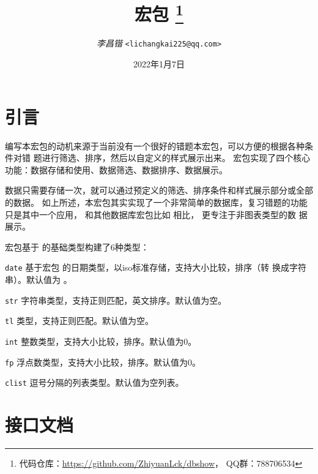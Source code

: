 \documentclass[full]{l3doc}
\begin{document}
\title{
   宏包
  \protect\footnote{%
    代码仓库：\url{https://github.com/ZhiyuanLck/dbshow}，
    QQ群：788706534}
}
\author{\textit{李昌锴} \texttt{<lichangkai225@qq.com>}}
\date{2022年1月7日}
\maketitle

\tableofcontents

\begin{documentation}

\section{引言}
编写本宏包的动机来源于当前没有一个很好的错题本宏包，可以方便的根据各种条件对错
题进行筛选、排序，然后以自定义的样式展示出来。 宏包实现了四个核心
功能：数据存储和使用、数据筛选、数据排序、数据展示。

数据只需要存储一次，就可以通过预定义的筛选、排序条件和样式展示部分或全部的数据。
如上所述，本宏包其实实现了一个非常简单的数据库，复习错题的功能只是其中一个应用，
和其他数据库宏包比如  相比， 更专注于非图表类型的数
据展示。

宏包基于  的基础类型构建了6种类型：
\begin{Description}
  \item[\texttt{date}]
    基于宏包  的日期类型，以iso标准存储，支持大小比较，排序（转
    换成字符串）。默认值为 。
  \item[\texttt{str}]
    字符串类型，支持正则匹配，英文排序。默认值为空。
  \item[\texttt{tl}]
    类型，支持正则匹配。默认值为空。
  \item[\texttt{int}]
    整数类型，支持大小比较，排序。默认值为0。
  \item[\texttt{fp}]
    浮点数类型，支持大小比较，排序。默认值为0。
  \item[\texttt{clist}]
    逗号分隔的列表类型。默认值为空列表。
\end{Description}

\section{接口文档}

\end{documentation}
\end{document}
